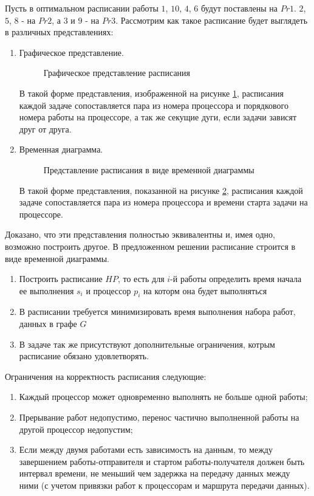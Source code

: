Пусть в оптимальном расписании работы $1$, $10$, $4$, $6$ будут поставлены на $Pr1$. $2$, $5$, $8$ - на $Pr2$, а $3$ и $9$ - на $Pr3$. Рассмотрим как такое расписание будет выглядеть в различных представлениях:
\begin{enumerate}
    \item Графическое представление.

    \begin{figure}[!htbp]
        \caption{Графическое представление расписания}
        \label{fig:graphical-form}
    \end{figure}
    В такой форме представления, изображенной на рисунке \ref{fig:graphical-form}, расписания каждой задаче сопоставляется пара из номера процессора и порядкового номера работы на процессоре, а так же секущие дуги, если задачи зависят друг от друга. 
    \item Временная диаграмма.

    \begin{figure}[!htbp]
        \caption{Представление расписания в виде временной диаграммы}
        \label{fig:time-diagram}
    \end{figure}
    В такой форме представления, показанной на рисунке \ref{fig:time-diagram}, расписания каждой задаче сопоставляется пара из номера процессора и времени старта задачи на процессоре.
\end{enumerate}
Доказано, что эти представления полностью эквивалентны и, имея одно, возможно построить другое. В предложенном решении расписание строится в виде временной диаграммы.


\begin{enumerate}
    \item Построить расписание $HP$, то есть для $i$-й работы определить время начала ее выполнения $s_i$ и процессор $p_i$ на которм она будет выполняться
    \item В расписании требуется минимизировать время выполнения набора работ, данных в графе $G$
    \item В задаче так же присутствуют дополнительные ограничения, котрым расписание обязано удовлетворять.
\end{enumerate}
Ограничения на корректность расписания следующие:
\begin{enumerate}
    \item Каждый процессор может одновременно выполнять не больше одной работы;
    \item Прерывание работ недопустимо, перенос частично выполненной работы на другой процессор недопустим;
    \item Если между двумя работами есть зависимость на данным, то между завершением работы-отправителя и стартом работы-получателя должен быть интервал времени, не меньший чем задержка на передачу данных между ними (с учетом привязки работ к процессорам и маршрута передачи данных).
\end{enumerate}
